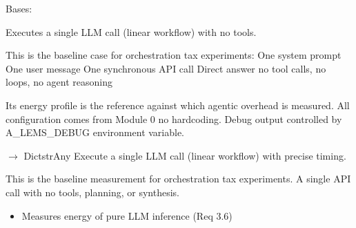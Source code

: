 \documentclass[letterpaper,10pt,english]{sphinxmanual}
\begin{document}
\begin{fulllineitems}
\label{\detokenize{core.execution:core.execution.LinearExecutor}}
\pysigstartsignatures
\pysiglinewithargsret
{}
{}
{}
\pysigstopsignatures
\sphinxAtStartPar
Bases: 

\sphinxAtStartPar
Executes a single LLM call (linear workflow) with no tools.

\sphinxAtStartPar
This is the baseline case for orchestration tax experiments:
\sphinxhyphen{} One system prompt
\sphinxhyphen{} One user message
\sphinxhyphen{} One synchronous API call
\sphinxhyphen{} Direct answer \textendash{} no tool calls, no loops, no agent reasoning

\sphinxAtStartPar
Its energy profile is the reference against which agentic overhead is measured.
All configuration comes from Module 0 \textendash{} no hardcoding.
Debug output controlled by A\_LEMS\_DEBUG environment variable.

\begin{fulllineitems}
\label{\detokenize{core.execution:core.execution.LinearExecutor.execute}}
\pysigstartsignatures
\pysiglinewithargsret
{}
{\sphinxparamcomma {}}
{{ $\rightarrow$ Dict\DUrole{p}{{[}}strAny\DUrole{p}{{]}}}}
\pysigstopsignatures
\sphinxAtStartPar
Execute a single LLM call (linear workflow) with precise timing.
\begin{description}
\sphinxAtStartPar
This is the baseline measurement for orchestration tax experiments.
A single API call with no tools, planning, or synthesis.

\begin{itemize}
\item {} 
\sphinxAtStartPar
Measures energy of pure LLM inference (Req 3.6)


\end{itemize}
\end{description}
\end{fulllineitems}
\end{fulllineitems}
\end{document}

